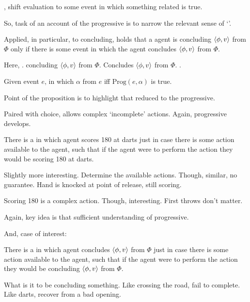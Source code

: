 \begin{note}
  , shift evaluation to some  event in which something related is true.

  So, task of an account of the progressive is to narrow the relevant sense of `'.

  Applied, in particular, to concluding,  holds that a agent is concluding \(\langle \phi, v \rangle\) from \(\Phi\) only if there is some  event in which the agent concludes \(\langle \phi, v \rangle\) from \(\Phi\).

  Here, \fc{}.
  concluding \(\langle \phi, v \rangle\) from \(\Phi\).
  Concludes \(\langle \phi, v \rangle\) from \(\Phi\).
  .
\end{note}

\begin{note}
  \begin{proposition}
    Given event \(e\), \pevent{} in which \(\alpha\) from \(e\) iff \(\text{Prog}(e,\alpha)\) is true.
  \end{proposition}

  Point of the proposition is to highlight that reduced \pevent{} to the progressive.
\end{note}

\begin{note}
  Paired with choice, allows complex `incomplete' actions.
  Again, progressive develops.

  \begin{illustration}[Darts]
    There is a \pevent{} in which agent scores 180 at darts just in case there is some action available to the agent, such that if the agent were to perform the action they would be scoring 180 at darts.
  \end{illustration}

  Slightly more interesting.
  Determine the available actions.
  Though, similar, no guarantee.
  Hand is knocked at point of release, still scoring.

  Scoring 180 is a complex action.
  Though, interesting.
  First throws don't matter.

  Again, key idea is that sufficient understanding of progressive.

  And, case of interest:

  \begin{illustration}[Concluding]
    There is a \pevent{} in which agent concludes \(\langle \phi, v \rangle\) from \(\Phi\) just in case there is some action available to the agent, such that if the agent were to perform the action they would be concluding \(\langle \phi, v \rangle\) from \(\Phi\).
  \end{illustration}

  What is it to be concluding something.
  Like crossing the road, fail to complete.
  Like darts, recover from a bad opening.
\end{note}

